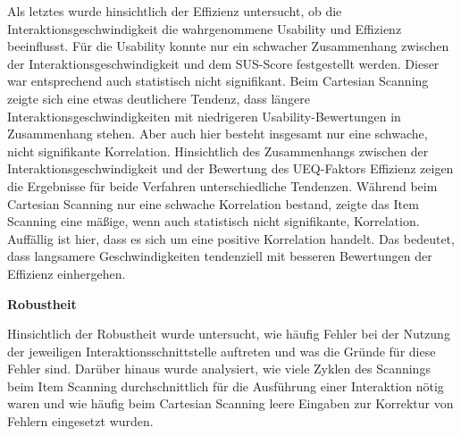 Als letztes wurde hinsichtlich der Effizienz untersucht, ob die Interaktionsgeschwindigkeit die wahrgenommene Usability und Effizienz beeinflusst. Für die Usability konnte nur ein schwacher Zusammenhang zwischen der Interaktionsgeschwindigkeit und dem SUS-Score festgestellt werden. Dieser war entsprechend auch statistisch nicht signifikant. Beim Cartesian Scanning zeigte sich eine etwas deutlichere Tendenz, dass längere Interaktionsgeschwindigkeiten mit niedrigeren Usability-Bewertungen in Zusammenhang stehen. Aber auch hier besteht insgesamt nur eine schwache, nicht signifikante Korrelation. 
Hinsichtlich des Zusammenhangs zwischen der Interaktionsgeschwindigkeit und der Bewertung des UEQ-Faktors Effizienz zeigen die Ergebnisse für beide Verfahren unterschiedliche Tendenzen. Während beim Cartesian Scanning nur eine schwache Korrelation bestand, zeigte das Item Scanning eine mäßige, wenn auch statistisch nicht signifikante, Korrelation. Auffällig ist hier, dass es sich um eine positive Korrelation handelt. Das bedeutet, dass langsamere Geschwindigkeiten tendenziell mit besseren Bewertungen der Effizienz einhergehen. %

\textbf{Robustheit}

Hinsichtlich der Robustheit wurde untersucht, wie häufig Fehler bei der Nutzung der jeweiligen Interaktionsschnittstelle auftreten und was die Gründe für diese Fehler sind. Darüber hinaus wurde analysiert, wie viele Zyklen des Scannings beim Item Scanning durchschnittlich für die Ausführung einer Interaktion nötig waren und wie häufig beim Cartesian Scanning leere Eingaben zur Korrektur von Fehlern eingesetzt wurden. 

